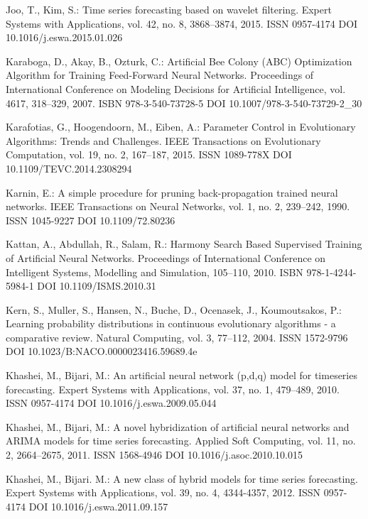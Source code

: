 \begin{thebibliography}{99.}
 Joo, T., Kim, S.: Time series forecasting based on wavelet filtering. Expert Systems with Applications, vol. 42, no. 8, 3868--3874, 2015. ISSN 0957-4174 DOI 10.1016/j.eswa.2015.01.026

 Karaboga, D., Akay, B., Ozturk, C.: Artificial Bee Colony (ABC) Optimization Algorithm for Training Feed-Forward Neural Networks. Proceedings of International Conference on Modeling Decisions for Artificial Intelligence, vol. 4617, 318--329, 2007. ISBN 978-3-540-73728-5 DOI 10.1007/978-3-540-73729-2\_30

 Karafotias, G., Hoogendoorn, M., Eiben, A.: Parameter Control in Evolutionary Algorithms: Trends and Challenges. IEEE Transactions on Evolutionary Computation, vol. 19, no. 2, 167--187, 2015. ISSN 1089-778X DOI 10.1109/TEVC.2014.2308294

 Karnin, E.: A simple procedure for pruning back-propagation trained neural networks. IEEE Transactions on Neural Networks, vol. 1, no. 2, 239--242, 1990. ISSN 1045-9227 DOI 10.1109/72.80236

 Kattan, A., Abdullah, R., Salam, R.: Harmony Search Based Supervised Training of Artificial Neural Networks. Proceedings of International Conference on Intelligent Systems, Modelling and Simulation, 105--110, 2010. ISBN 978-1-4244-5984-1 DOI 10.1109/ISMS.2010.31

 Kern, S., Muller, S., Hansen, N., Buche, D., Ocenasek, J., Koumoutsakos, P.: Learning probability distributions in continuous evolutionary algorithms - a comparative review. Natural Computing, vol. 3, 77--112, 2004. ISSN 1572-9796 DOI 10.1023/B:NACO.0000023416.59689.4e

 Khashei, M., Bijari, M.: An artificial neural network (p,d,q) model for timeseries forecasting. Expert Systems with Applications, vol. 37, no. 1, 479--489, 2010. ISSN 0957-4174 DOI 10.1016/j.eswa.2009.05.044

 Khashei, M., Bijari, M.: A novel hybridization of artificial neural networks and ARIMA models for time series forecasting. Applied Soft Computing, vol. 11, no. 2, 2664--2675, 2011. ISSN 1568-4946 DOI 10.1016/j.asoc.2010.10.015

 Khashei, M., Bijari. M.: A new class of hybrid models for time series forecasting. Expert Systems with Applications, vol. 39, no. 4, 4344-4357, 2012. ISSN 0957-4174 DOI 10.1016/j.eswa.2011.09.157


\end{thebibliography}
